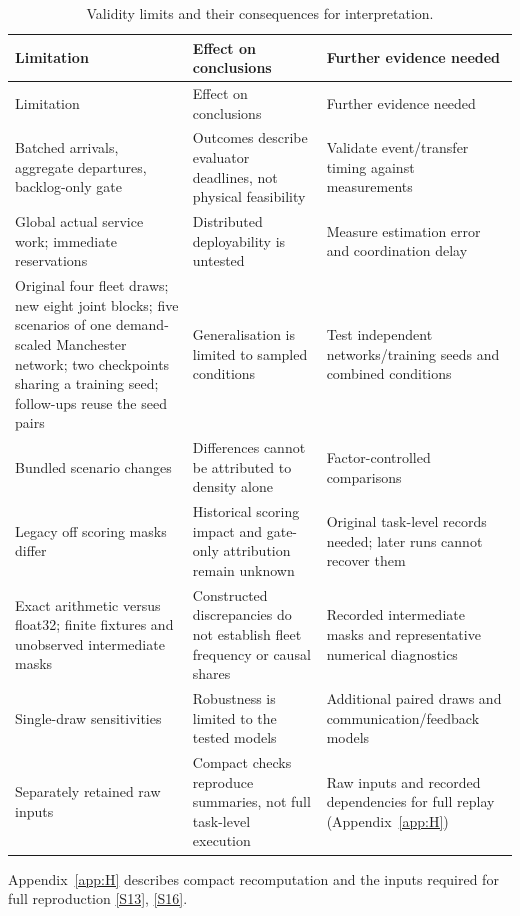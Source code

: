\documentclass[12pt,a4paper]{article}
\begin{document}
\FloatBarrier
\begingroup
\singlespacing\footnotesize\setlength{\tabcolsep}{3pt}
\begin{xltabular}{\textwidth}{@{}YYY@{}}
\caption[Validity limits]{Validity limits and their consequences for interpretation.}\label{tab:8} \\
\toprule
Limitation & Effect on conclusions & Further evidence needed \\
\midrule\endfirsthead
\toprule
Limitation & Effect on conclusions & Further evidence needed \\
\midrule\endhead
\bottomrule\endfoot
Batched arrivals, aggregate departures, backlog-only gate & Outcomes describe evaluator deadlines, not physical feasibility & Validate event/transfer timing against measurements \\
Global actual service work; immediate reservations & Distributed deployability is untested & Measure estimation error and coordination delay \\
Original four fleet draws; new eight joint blocks; five scenarios of one demand-scaled Manchester network; two checkpoints sharing a training seed; follow-ups reuse the seed pairs & Generalisation is limited to sampled conditions & Test independent networks/training seeds and combined conditions \\
Bundled scenario changes & Differences cannot be attributed to density alone & Factor-controlled comparisons \\
Legacy off scoring masks differ & Historical scoring impact and gate-only attribution remain unknown & Original task-level records needed; later runs cannot recover them \\
Exact arithmetic versus float32; finite fixtures and unobserved intermediate masks & Constructed discrepancies do not establish fleet frequency or causal shares & Recorded intermediate masks and representative numerical diagnostics \\
Single-draw sensitivities & Robustness is limited to the tested models & Additional paired draws and communication/feedback models \\
Separately retained raw inputs & Compact checks reproduce summaries, not full task-level execution & Raw inputs and recorded dependencies for full replay (Appendix~\ref{app:H}) \\
\end{xltabular}
\endgroup

Appendix~\ref{app:H} describes compact recomputation and the inputs required for full reproduction \hyperref[source-s13]{[S13]}, \hyperref[source-s16]{[S16]}.
\end{document}
